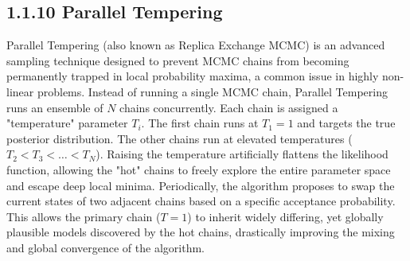 \subsection{1.1.10 Parallel Tempering}
Parallel Tempering (also known as Replica Exchange MCMC) is an advanced sampling technique designed to prevent MCMC chains from becoming permanently trapped in local probability maxima, a common issue in highly non-linear problems. Instead of running a single MCMC chain, Parallel Tempering runs an ensemble of $N$ chains concurrently. Each chain is assigned a "temperature" parameter $T_i$. The first chain runs at $T_1 = 1$ and targets the true posterior distribution. The other chains run at elevated temperatures ($T_2 < T_3 < \dots < T_N$). Raising the temperature artificially flattens the likelihood function, allowing the "hot" chains to freely explore the entire parameter space and escape deep local minima. Periodically, the algorithm proposes to swap the current states of two adjacent chains based on a specific acceptance probability. This allows the primary chain ($T=1$) to inherit widely differing, yet globally plausible models discovered by the hot chains, drastically improving the mixing and global convergence of the algorithm.

